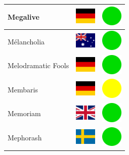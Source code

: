 \documentclass[12pt, a4paper, twoside]{report}
\begin{document}
\begin{center}
\begin{longtable}{|p{5cm}|p{2cm}|p{2cm}|}
 Megalive                                                   & \includegraphics[width=1cm]{../4x3/de} &   \includegraphics[width=1cm]{../likes/y} \\ \hline
 Mélancholia                                                & \includegraphics[width=1cm]{../4x3/au} &   \includegraphics[width=1cm]{../likes/y} \\ \hline
 Melodramatic Fools                                         & \includegraphics[width=1cm]{../4x3/de} &   \includegraphics[width=1cm]{../likes/y} \\ \hline
 Membaris                                                   & \includegraphics[width=1cm]{../4x3/de} &   \includegraphics[width=1cm]{../likes/m} \\ \hline
 Memoriam                                                   & \includegraphics[width=1cm]{../4x3/gb} &   \includegraphics[width=1cm]{../likes/y} \\ \hline
 Mephorash                                                  & \includegraphics[width=1cm]{../4x3/se} &   \includegraphics[width=1cm]{../likes/y} \\ \hline

\end{longtable}
\end{center}
\end{document}
